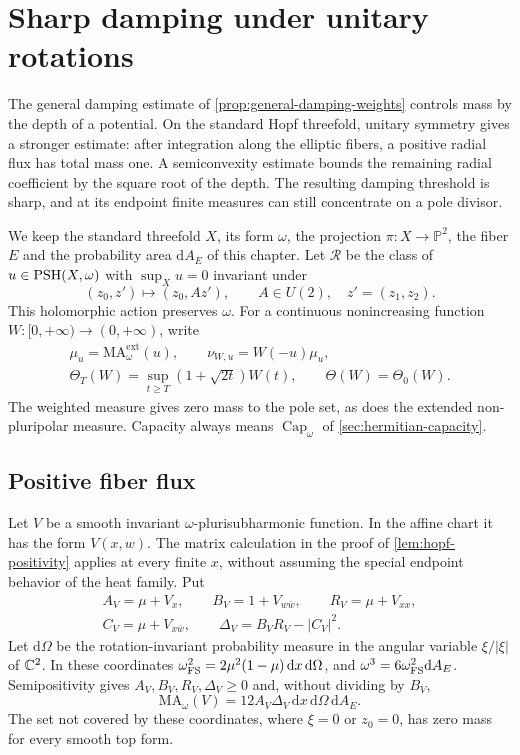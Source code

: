 \section{Sharp damping under unitary rotations}
\label{sec:hopf-rotational-damping}

The general damping estimate of \cref{prop:general-damping-weights} controls mass by the depth of a potential. On the standard Hopf threefold, unitary symmetry gives a stronger estimate: after integration along the elliptic fibers, a positive radial flux has total mass one. A semiconvexity estimate bounds the remaining radial coefficient by the square root of the depth. The resulting damping threshold is sharp, and at its endpoint finite measures can still concentrate on a pole divisor.

We keep the standard threefold $X$, its form $\omega$, the projection $\pi\colon X\to\mathbb P^2$, the fiber $E$ and the probability area $\mathrm dA_E$ of this chapter. Let $\mathcal R$ be the class of $u\in\mathrm{PSH}(X,\omega)$ with $\sup_Xu=0$ invariant under
\[
 (z_0,z')\longmapsto(z_0,Az'),\qquad A\in U(2),\quad z'=(z_1,z_2).
\]
This holomorphic action preserves $\omega$. For a continuous nonincreasing function $W\colon[0,+\infty)\to(0,+\infty)$, write
\begin{gather*}
 \mu_u=\mathrm{MA}^{\mathrm{ext}}_\omega(u),\qquad
 \nu_{W,u}=W(-u)\mu_u,\\
 \Theta_T(W)=\sup_{t\geq T}(1+\sqrt{2t})W(t),\qquad \Theta(W)=\Theta_0(W).
\end{gather*}
The weighted measure gives zero mass to the pole set, as does the extended non-pluripolar measure. Capacity always means $\operatorname{Cap}_\omega$ of \cref{sec:hermitian-capacity}.

\subsection{Positive fiber flux}

Let $V$ be a smooth invariant $\omega$-plurisubharmonic function.
In the affine chart it has the form $V(x,w)$. The matrix calculation in the proof of \cref{lem:hopf-positivity}
applies at every finite $x$, without assuming the special endpoint behavior
of the heat family. Put
\begin{gather*}
 A_V=\mu+V_x,\qquad B_V=1+V_{w\bar w},\qquad R_V=\mu+V_{xx},\\
 C_V=\mu+V_{x\bar w},\qquad \Delta_V=B_VR_V-|C_V|^2.
\end{gather*}
Let $\mathrm d\Omega$ be the rotation-invariant probability measure in the angular variable $\xi/|\xi|$ of $\mathbb C^2$. In these coordinates $\omega_{\mathrm{FS}}^2=2\mu^2(1-\mu)\,\mathrm dx\,\mathrm d\Omega$, and $\omega^3=6\omega_{\mathrm{FS}}^2\mathrm dA_E$. Semipositivity gives $A_V,B_V,R_V,\Delta_V\geq0$ and, without dividing
by $B_V$,
\begin{equation}\label{eq:rotational-positive-density}
 \mathrm{MA}_\omega(V)=12 A_V\Delta_V\,
       \mathrm dx\,\mathrm d\Omega\,\mathrm dA_E.
\end{equation}
The set not covered by these coordinates, where $\xi=0$ or $z_0=0$, has zero mass for every smooth top form.

